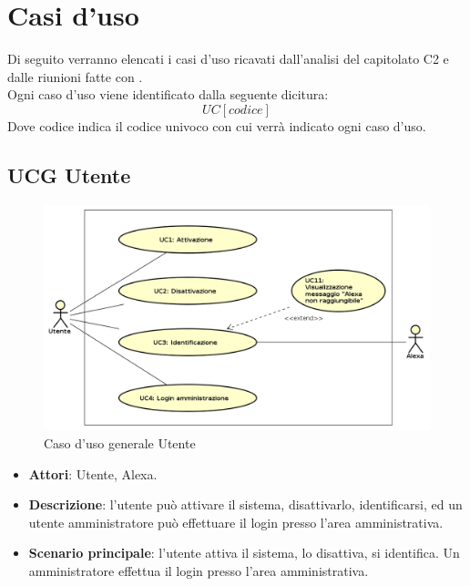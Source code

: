 \documentclass[../AnalisiDeiRequisiti_v4.0.0.tex]{subfiles}
\begin{document}
\section{Casi d'uso}
Di seguito verranno elencati i casi d'uso ricavati dall'analisi del capitolato C2 e dalle riunioni fatte con \prop.\\
Ogni caso d'uso viene identificato dalla seguente dicitura:
\begin{equation*}
	UC[codice]
\end{equation*}
Dove codice indica il codice univoco con cui verrà indicato ogni caso d'uso.

\subsection{UCG Utente} 
\label{sssec:UCG_Utente}
\begin{figure}[!h]
	\centering
	\includegraphics[width=\textwidth]{UseCases/UCG_Utente/UCG_Utente.png}
	\caption{Caso d'uso generale Utente}
\end{figure}
\begin{itemize} 
\item \textbf{Attori}: Utente, Alexa.
\item \textbf{Descrizione}: l'utente può attivare il sistema, disattivarlo, identificarsi, ed un utente amministratore può effettuare il login presso l'area amministrativa.
\item \textbf{Scenario principale}: l'utente attiva il sistema, lo disattiva, si identifica. Un amministratore effettua il login presso l'area amministrativa.
\end{itemize}
\newpage
\end{document}
